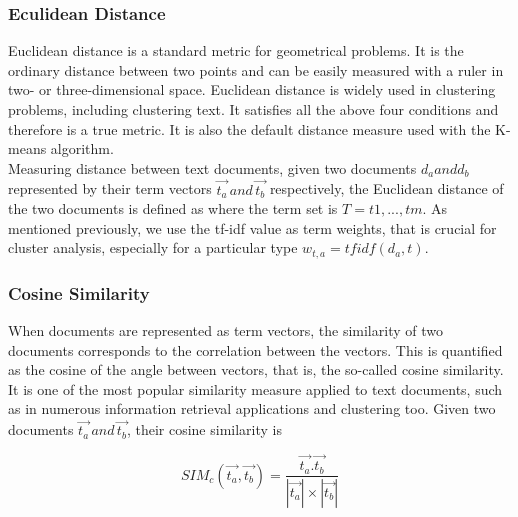 \subsubsection{Eculidean Distance}
\label {euclidean}
Euclidean distance is a standard metric for geometrical problems. It is the ordinary distance between two points and can be easily measured with a ruler in two- or three-dimensional space. Euclidean distance is widely used in clustering problems, including clustering text. It satisfies all the above four conditions and therefore is a true metric. It is also the default distance measure used with the K-means algorithm.\\
Measuring distance between text documents, given two documents $d_{a} and  d_{b}$ represented by their term vectors  $\overrightarrow{t_{a}} \,and\, \overrightarrow{t_{b}}$ respectively, the Euclidean distance of the two documents is defined as
where the term set is $T = {t1 , . . . , tm }$. As mentioned previously, we use the tf-idf value as term weights, that is
crucial for cluster analysis, especially for a particular type $w_{t,a} = tf idf (d_{a} , t)$.

\subsubsection{Cosine Similarity}
\label {cosine}
When documents are represented as term vectors, the similarity of two documents corresponds to the correlation between the vectors. This is quantified as the cosine of the angle between vectors, that is, the so-called cosine similarity. It is one of the most popular similarity measure applied to text documents, such as in numerous information retrieval applications and clustering too.
Given two documents $\overrightarrow{t_{a}} \,and\, \overrightarrow{t_{b}}$, their cosine similarity is

\begin{equation}
SIM_{c}(\vec{t_{a}},\vec{t_{b}}) =\frac{\vec{t_{a}}.\vec{t_{b}}}{|\vec{t_{a}}|\times|\vec{t_{b}}|}
\end{equation}

